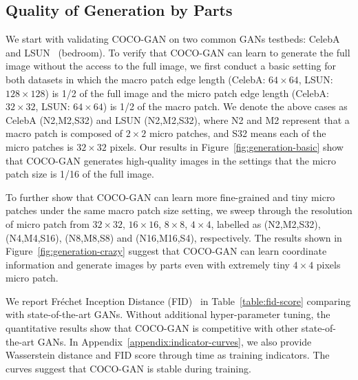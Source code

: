 \documentclass{article}
\newcommand{\modelName}{COCO-GAN }
\begin{document}
    \subsection{Quality of Generation by Parts}
    
        \label{exp:generation-image-quality}
    
        We start with validating \modelName on two common GANs testbeds: CelebA~\cite{CelebA} and LSUN~\cite{LSUN} (bedroom). To verify that \modelName can learn to generate the full image without the access to the full image, we first conduct a basic setting for both datasets in which the macro patch edge length (CelebA: $64\times 64$, LSUN: $128\times 128$) is 1/2 of the full image and the micro patch edge length (CelebA: $32\times 32$, LSUN: $64\times 64$) is 1/2 of the macro patch. We denote the above cases as CelebA (N2,M2,S32) and LSUN (N2,M2,S32), where N2 and M2 represent that a macro patch is composed of $2\times2$ micro patches, and S32 means each of the micro patches is $32\times32$ pixels.
        Our results in Figure~\ref{fig:generation-basic} show that \modelName generates high-quality images in the settings that the micro patch size is 1/16 of the full image.
        
        To further show that \modelName can learn more fine-grained and tiny micro patches under the same macro patch size setting, we sweep through the resolution of micro patch from $32\times32$, $16\times16$, $8\times8$, $4\times4$, labelled as (N2,M2,S32), (N4,M4,S16), (N8,M8,S8) and (N16,M16,S4), respectively. The results shown in Figure~\ref{fig:generation-crazy} suggest that \modelName can learn coordinate information and generate images by parts even with extremely tiny $4\times4$ pixels micro patch. 
        
        \label{exp:fid-score}
        
        We report Fréchet Inception Distance (FID)~\cite{fid} in Table~\ref{table:fid-score} comparing with state-of-the-art GANs. Without additional hyper-parameter tuning, the quantitative results show that \modelName is competitive with other state-of-the-art GANs. In Appendix~\ref{appendix:indicator-curves}, we also provide Wasserstein distance and FID score through time as training indicators. The curves suggest that \modelName is stable during training.
        
\end{document}
